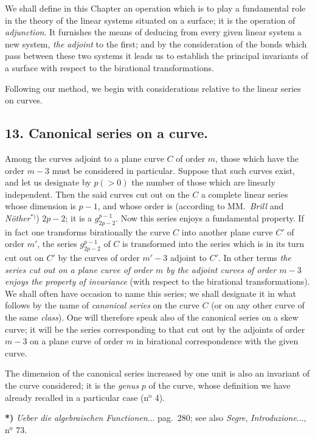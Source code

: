 \documentclass{article}
\begin{document}
We shall define in this Chapter an operation which is to play a fundamental role in the theory of the linear systems situated on a surface; it is the operation of \emph{adjunction}. It furnishes the means of deducing from every given linear system a new system, \emph{the adjoint} to the first; and by the consideration of the bonds which pass between these two systems it leads us to establish the principal invariants of a surface with respect to the birational transformations.

Following our method, we begin with considerations relative to the linear series on curves.

\subsection*{13. Canonical series on a curve.}

Among the curves adjoint to a plane curve $C$ of order $m$, those which have the order $m - 3$ must be considered in particular. Suppose that such curves exist, and let us designate by $p(>0)$ the number of those which are linearly independent. Then the said curves cut out on the $C$ a complete linear series whose dimension is $p - 1$, and whose order is (according to MM.\ \emph{Brill} and \emph{Nöther}${}^{*)}$) $2p - 2$; it is a $g_{2p-2}^{p-1}$. Now this series enjoys a fundamental property. If in fact one transforms birationally the curve $C$ into another plane curve $C'$ of order $m'$, the series $g_{2p-2}^{p-1}$ of $C$ is transformed into the series which is in its turn cut out on $C'$ by the curves of order $m' - 3$ adjoint to $C'$. In other terms \emph{the series cut out on a plane curve of order $m$ by the adjoint curves of order $m - 3$ enjoys the property of invariance} (with respect to the birational transformations). We shall often have occasion to name this series; we shall designate it in what follows by the name of \emph{canonical series} on the curve $C$ (or on any other curve of the same \emph{class}). One will therefore speak also of the canonical series on a skew curve; it will be the series corresponding to that cut out by the adjoints of order $m - 3$ on a plane curve of order $m$ in birational correspondence with the given curve.

The dimension of the canonical series increased by one unit is also an invariant of the curve considered; it is the \emph{genus} $p$ of the curve, whose definition we have already recalled in a particular case (n${}^{\text{o}}$ 4).

\textbf{*)} \emph{Ueber die algebraischen Functionen}... pag.\ 280; see also \emph{Segre}, \emph{Introduzione}..., n${}^{\text{o}}$ 73.
\end{document}
